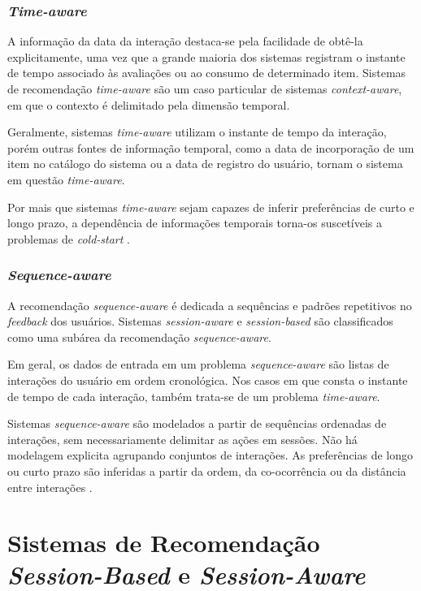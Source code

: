 \subsubsection{\textit{Time-aware}}

A informação da data da interação destaca-se
pela facilidade de obtê-la explicitamente, uma vez que a grande maioria dos
sistemas registram o instante de tempo associado às avaliações ou ao consumo de
determinado item. Sistemas de recomendação \textit{time-aware} são um caso
particular de sistemas \textit{context-aware}, em que o contexto é delimitado
pela dimensão temporal.

Geralmente, sistemas \textit{time-aware} utilizam o instante de tempo da
interação, porém outras fontes de informação temporal, como a data de
incorporação de um item no catálogo do sistema ou a data de registro do usuário,
tornam o sistema em questão \textit{time-aware}.

Por mais que sistemas \textit{time-aware} sejam capazes de inferir preferências
de curto e longo prazo, a dependência de informações temporais torna-os
suscetíveis a problemas de \textit{cold-start} \cite{rec_sys_handbook_2022_multi}.

\subsubsection{\textit{Sequence-aware}}
A recomendação \textit{sequence-aware} é dedicada a sequências e padrões
repetitivos no \textit{feedback} dos usuários. Sistemas \textit{session-aware} e
\textit{session-based} são classificados como uma subárea da recomendação
\textit{sequence-aware}.

Em geral, os dados de entrada em um problema \textit{sequence-aware} são listas
de interações do usuário em ordem cronológica. Nos casos em que consta o instante
de tempo de cada interação, também trata-se de um problema \textit{time-aware}.

Sistemas \textit{sequence-aware} são modelados a partir de sequências ordenadas
de interações, sem necessariamente delimitar as ações em sessões. Não há
modelagem explicita agrupando conjuntos de interações. As preferências de longo
ou curto prazo são inferidas a partir da ordem, da co-ocorrência ou da distância
entre interações \cite{sessionbaseddp, quadrana2018sequence}.


\section{Sistemas de Recomendação \textit{Session-Based} e \textit{Session-Aware}}

